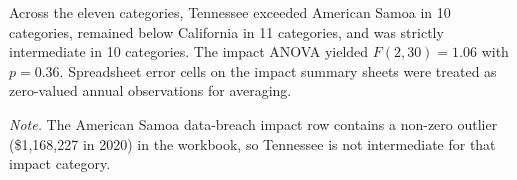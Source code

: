 Across the eleven categories, Tennessee exceeded American Samoa in 10 categories, remained below California in 11 categories, and was strictly intermediate in 10 categories. The impact ANOVA yielded $F(2,30)=1.06$ with $p=0.36$. Spreadsheet error cells on the impact summary sheets were treated as zero-valued annual observations for averaging.

\noindent\textit{Note.} The American Samoa data-breach impact row contains a non-zero outlier (\$1{,}168{,}227 in 2020) in the workbook, so Tennessee is not intermediate for that impact category.
